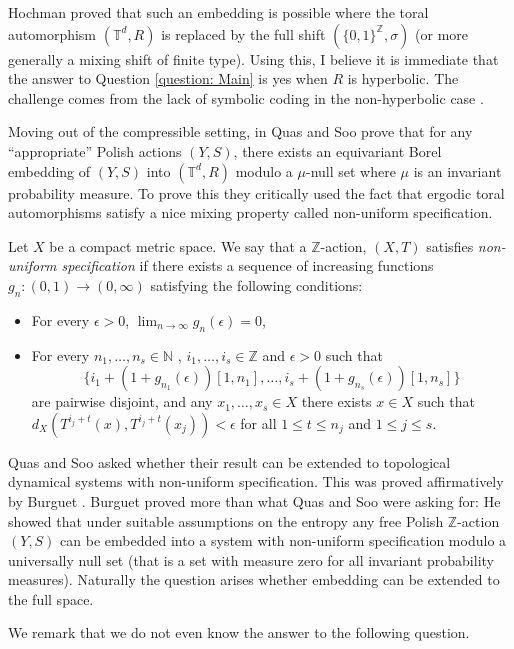 \documentclass{article}
\theoremstyle{definition}
\newcommand{\Z}{\mathbb{Z}}
\begin{document}
Hochman \cite{MR3880210} proved that such an embedding is possible where the toral automorphism $(\mathbb T^d, R)$ is replaced by the full shift $(\{0,1\}^{\Z}, \sigma )$ (or more generally a mixing shift of finite type). Using this, I believe it is immediate that the answer to Question \ref{question: Main} is yes when $R$ is hyperbolic. The challenge comes from the lack of symbolic coding in the non-hyperbolic case \cite{lindenstrauss2004invariant, lindenstrauss2005symbolic}. 

Moving out of the compressible setting, in \cite{MR3453367} Quas and Soo prove that for any ``appropriate'' Polish actions $(Y, S)$, there exists an equivariant Borel embedding of $(Y,S)$ into $(\mathbb T^d, R)$ modulo a $\mu$-null set where $\mu$ is an invariant probability measure. To prove this they critically used the fact that ergodic toral automorphisms satisfy a nice mixing property called non-uniform specification.

  Let $X$ be a compact metric space. We say that a $\Z$-action, $(X,T)$ satisfies \emph{non-uniform specification} if 
 there exists a sequence of increasing functions $g_n:(0,1) \to (0,\infty)$ satisfying the following conditions:
 \begin{itemize}
 	\item For every $\epsilon>0$, $\lim_{n \to \infty}g_n(\epsilon)= 0$,
 	\item For  every $n_1,\ldots,n_s \in \mathbb{N}$ , $i_1,\ldots,i_s \in \mathbb{Z}$ and  $\epsilon>0$ such that 
 	$$\{i_1 + (1+g_{n_1}(\epsilon))[1, n_1],\ldots, i_s + (1+g_{n_s}(\epsilon))[1, n_s]\}$$
 	are pairwise disjoint, 
 	and any $x_1,\ldots,x_s \in X$ there exists $x \in X$ such that $d_X(T^{i_j+t}(x), T^{i_j+t}(x_j)) < \epsilon$ for all $1\leq t\leq n_j$ and $1 \le j \le s$.
 \end{itemize}
 
 Quas and Soo asked whether their result can be extended to topological dynamical systems with non-uniform specification. This was proved affirmatively by Burguet \cite{burguet2020topological}. Burguet proved more than what Quas and Soo were asking for: He showed that under suitable assumptions on the entropy any free Polish $\Z$-action $(Y, S)$ can be embedded into a system with non-uniform specification modulo a universally null set (that is a set with measure zero for all invariant probability measures). Naturally the question arises whether embedding can be extended to the full space.
 
 We remark that we do not even know the answer to the following question. 
 
\end{document}
